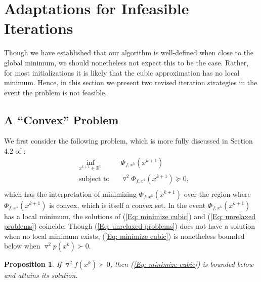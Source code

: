 \documentclass[11pt]{article}
\theoremstyle{plain}
\newtheorem{proposition}[theorem]{Proposition}
\theoremstyle{definition}
\theoremstyle{remark}
\def \Hess{\triangledown^2}
\def \R{\mathbb{R}}
\def \Rn{\R^n}
\begin{document}
\section{Adaptations for Infeasible Iterations}\label{Sec: Adaptations}

Though we have established that our algorithm is well-defined when close to the global minimum, we should nonetheless not expect this to be the case. Rather, for most initializations it is likely that the cubic approximation has no local minimum. Hence, in this section we present two revised iteration strategies in the event the problem is not feasible.

\subsection{A ``Convex'' Problem}\label{SSec: Convex Problem}


We first consider the following problem, which is more fully discussed in Section 4.2 of \cite{ahmadi2022complexity}:
\begin{equation}\label{Eq: minimize cubic}
    \begin{aligned}
	& \underset{x^{k+1} \in \Rn}{\inf} 
	& & \Phi_{f,x^k}(x^{k+1})\\
	& \text{subject to}
	&& \Hess \Phi_{f,x^k}(x^{k+1}) \succeq 0,\\
    \end{aligned}
\end{equation}
which has the interpretation of minimizing $\Phi_{f,x^k}(x^{k+1})$ over the region where $\Phi_{f,x^k}(x^{k+1})$ is convex, which is itself a convex set. In the event $\Phi_{f,x^k}(x^{k+1})$ has a local minimum, the solutions of (\ref{Eq: minimize cubic}) and (\ref{Eq: unrelaxed problems}) coincide. Though (\ref{Eq: unrelaxed problems}) does not have a solution when no local minimum exists, (\ref{Eq: minimize cubic}) is nonetheless bounded below when $\Hess p(x^{k}) \succ 0$.

\begin{proposition} If $\Hess f(x^{k}) \succ 0$, then (\ref{Eq: minimize cubic}) is bounded below and attains its solution.\end{proposition}
\end{document}
